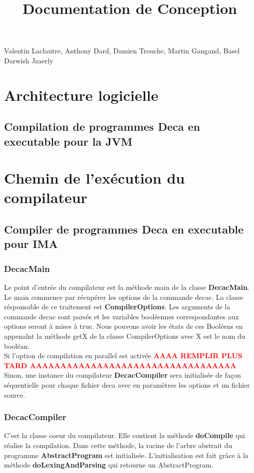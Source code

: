 \documentclass[12pt, a4paper, one side]{article}
\title{Documentation de Conception}
\author{}
\date{}
\begin{document}
    \maketitle

    \begin{center}
        Valentin Laclautre, Anthony Dard, Damien Trouche, Martin Gangand, Basel Darwish Jzaerly
    \end{center}

    \tableofcontents
    \section{Architecture logicielle}
    \subsection{Compilation de programmes Deca en executable pour la JVM}
    \section{Chemin de l'exécution du compilateur}
    \subsection{Compiler de programmes Deca en executable pour IMA}

    \subsubsection{DecacMain}
    Le point d'entrée du compilateur est la méthode main de la classe \textbf {DecacMain}. Le main commence par récupérer les options de la commande decac. La classe résponsable de ce traitement est \textbf{CompilerOptions}. Les arguments de la commande decac sont parsés et les variables booléennes correspondantes aux options seront à mises à true. Nous pouvons avoir les états de ces Booléens en appenalnt la méthode getX de la classe CompilerOptions avec X est le nom du booléan.
    \\
    Si l'option de compilation en parallel est activée \textbf {\textcolor{red}{AAAA REMPLIR PLUS TARD AAAAAAAAAAAAAAAAAAAAAAAAAAAAAAAAAA}} \\
    Sinon, une instance du compilateur \textbf{DecacCompiler} sera initialisée de façon séquentielle pour chaque fichier deca avec en paramètres les options et un fichier source.

    \subsubsection{DecacCompiler} C'est la classe coeur du compilateur. Elle contient la méthode \textbf{doCompile} qui réalise la compilation. Dans cette méthode, la racine de l'arbre abstrait du programme \textbf{AbstractProgram} est initialisée. L'initialisation est fait grâce à la méthode \textbf{doLexingAndParsing} qui retourne un AbstractProgram.
\end{document}
